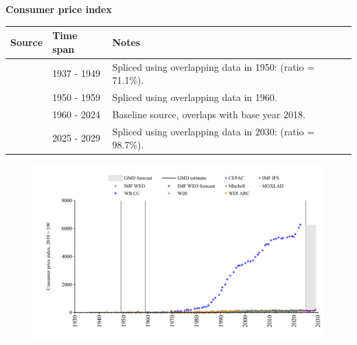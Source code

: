 \documentclass[12pt,a4paper,landscape]{article}
\begin{document}
\begin{adjustbox}{max totalsize={\paperwidth}{\paperheight},center}
\begin{minipage}[t][\textheight][t]{\textwidth}
\vspace*{0.5cm}
{}
\begin{center}
{\Large\bfseries Consumer price index}
\end{center}
\vspace{0.5cm}
\begin{table}[H]
\centering
\small
\begin{tabular}{|l|l|l|}
\hline
\textbf{Source} & \textbf{Time span} & \textbf{Notes} \\
\hline
\rowcolor{white}\cite{MOXLAD}& 1937 - 1949 &Spliced using overlapping data in 1950: (ratio = 71.1\%). \\
\rowcolor{lightgray}\cite{IMF_IFS}& 1950 - 1959 &Spliced using overlapping data in 1960. \\
\rowcolor{white}\cite{WDI}& 1960 - 2024 &Baseline source, overlaps with base year 2018. \\
\rowcolor{lightgray}\cite{IMF_WEO_forecast}& 2025 - 2029 &Spliced using overlapping data in 2030: (ratio = 98.7\%). \\
\hline
\end{tabular}
\end{table}
\begin{figure}[H]
\centering
\includegraphics[width=\textwidth,height=0.6\textheight,keepaspectratio]{graphs/SLV_CPI.pdf}
\end{figure}
\end{minipage}
\end{adjustbox}
\end{document}
